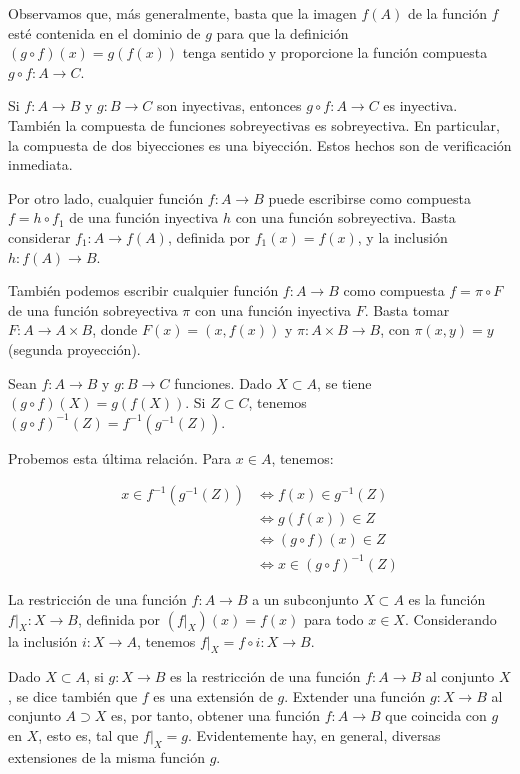 Observamos que, más generalmente, basta que la imagen \(f(A)\) de la función \(f\) esté contenida en el dominio de \(g\) para que la definición \((g \circ f)(x) = g(f(x))\) tenga sentido y proporcione la función compuesta \(g \circ f: A \to C\).

Si \(f: A \to B\) y \(g: B \to C\) son inyectivas, entonces \(g \circ f: A \to C\) es inyectiva. También la compuesta de funciones sobreyectivas es sobreyectiva. En particular, la compuesta de dos biyecciones es una biyección. Estos hechos son de verificación inmediata.

Por otro lado, cualquier función \(f: A \to B\) puede escribirse como compuesta \(f = h \circ f_1\) de una función inyectiva \(h\) con una función sobreyectiva. Basta considerar \(f_1: A \to f(A)\), definida por \(f_1(x) = f(x)\), y la inclusión \(h: f(A) \to B\).

También podemos escribir cualquier función \(f: A \to B\) como compuesta \(f = \pi \circ F\) de una función sobreyectiva \(\pi\) con una función inyectiva \(F\). Basta tomar \(F: A \to A \times B\), donde \(F(x) = (x, f(x))\) y \(\pi: A \times B \to B\), con \(\pi(x, y) = y\) (segunda proyección).

Sean \(f: A \to B\) y \(g: B \to C\) funciones. Dado \(X \subset A\), se tiene \((g \circ f)(X) = g(f(X))\). Si \(Z \subset C\), tenemos \((g \circ f)^{-1}(Z) = f^{-1}(g^{-1}(Z))\).

Probemos esta última relación. Para \(x \in A\), tenemos:

\begin{align*}
x \in f^{-1}(g^{-1}(Z)) &\iff f(x) \in g^{-1}(Z) \\
&\iff g(f(x)) \in Z \\
&\iff (g \circ f)(x) \in Z \\
&\iff x \in (g \circ f)^{-1}(Z)
\end{align*}

La restricción de una función \(f: A \to B\) a un subconjunto \(X \subset A\) es la función \(f|_X: X \to B\), definida por \((f|_X)(x) = f(x)\) para todo \(x \in X\). Considerando la inclusión \(i: X \to A\), tenemos \(f|_X = f \circ i: X \to B\).

Dado \(X \subset A\), si \(g: X \to B\) es la restricción de una función \(f: A \to B\) al conjunto \(X\), se dice también que \(f\) es una extensión de \(g\). Extender una función \(g: X \to B\) al conjunto \(A \supset X\) es, por tanto, obtener una función \(f: A \to B\) que coincida con \(g\) en \(X\), esto es, tal que \(f|_X = g\). Evidentemente hay, en general, diversas extensiones de la misma función \(g\).

